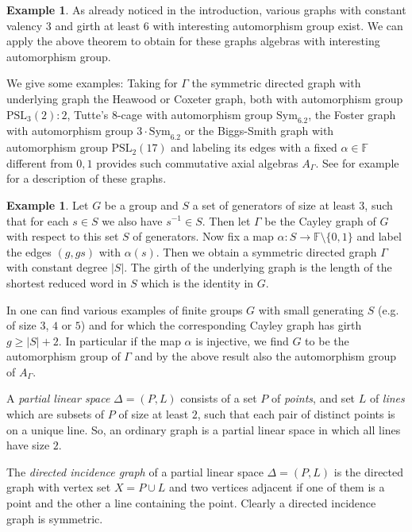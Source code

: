 \documentclass[oneside,a4paper]{amsart} %
\theoremstyle{definition}
\newtheorem{example}[proposition]{Example}
\begin{document}
\begin{example}
As already noticed in the introduction, various graphs with constant valency $3$ and girth at least $6$ with interesting automorphism group exist.
We can apply the above theorem to obtain for these graphs algebras with interesting automorphism group.

We give some examples:
Taking for $\Gamma$ the symmetric directed graph with underlying graph the    Heawood or Coxeter graph, both with automorphism group $\mathrm{PSL}_3(2):2$,
Tutte's 8-cage with automorphism group $\mathrm{Sym}_6.2$, the Foster graph with  automorphism group $3\cdot\mathrm{Sym}_6.2$ or the Biggs-Smith graph with automorphism group $\mathrm{PSL}_2(17)$ and labeling its edges with a fixed  $\alpha\in \mathbb{F}$ different from $0,1$ provides such commutative axial algebras $A_\Gamma$. See for example \cite{drg} for a description of these graphs.
\end{example}


\begin{example}
Let $G$ be a group and $S$ a set of generators of size at least $3$, such that for each $s\in S$ we also have $s^{-1}\in S$.
Then let $\Gamma$ be the Cayley graph of $G$ with respect to this set $S$ of generators.
Now fix a map $\alpha:S\rightarrow \mathbb{F}\setminus \{0,1\}$ and label the edges $(g,gs)$ with $\alpha(s)$.
Then we obtain a symmetric directed graph $\Gamma$ with constant degree $|S|$.
The girth of the underlying graph is the length of the shortest reduced word in $S$ which is the identity in $G$.

In \cite{bray,cayley} one can find various examples of finite groups $G$ with small generating  $S$ (e.g. of size  $3$, $4$  or $5$) and for which  the 
corresponding Cayley graph has girth $g\geq |S|+2$.
In particular if the map $\alpha$ is injective, we find $G$ to be the automorphism group of $\Gamma$ and by the above result
also the automorphism group of $A_\Gamma$.
\end{example}



A \emph{partial linear space} $\Delta=(P,L)$ consists of a set $P$ of \emph{points}, and set $L$ of \emph{lines} which are subsets of $P$ of size at least $2$, such that each pair of distinct points is on a unique line.
So, an ordinary graph is a partial linear space in which all lines have size $2$.

The \emph{directed incidence graph} of a partial linear space $\Delta=(P,L)$ is the directed graph with vertex set $X=P\cup L$ and two vertices adjacent if one of them is a point and the other a line containing the point.
Clearly a directed incidence graph is symmetric.
\end{document}
